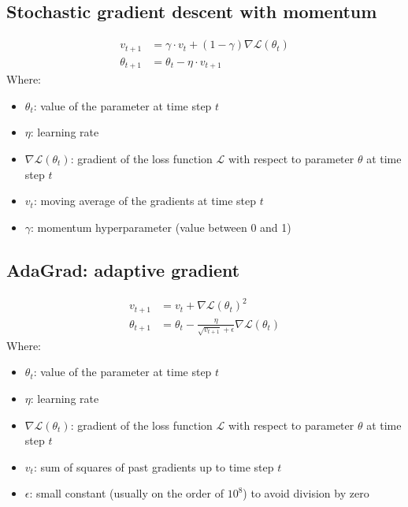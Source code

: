 \documentclass[a4paper]{report}
\newcommand{\ELL}{\mathcal{L}}
\begin{document}
\subsection{Stochastic gradient descent with momentum}
\begin{align*}
    v_{t+1}      &= \gamma \cdot v_t + (1-\gamma) \nabla\ELL(\theta_t) \\
    \theta_{t+1} &= \theta_t - \eta \cdot v_{t+1}
\end{align*}
Where:
\begin{itemize}
    \item $\theta_t$: value of the parameter at time step $t$
    \item $\eta$: learning rate
    \item $\nabla\ELL(\theta_t)$: gradient of the loss function $\ELL$ with respect to parameter $\theta$ at time step $t$
    \item $v_t$: moving average of the gradients at time step $t$
    \item $\gamma$: momentum hyperparameter (value between 0 and 1)
\end{itemize}

\subsection{AdaGrad: adaptive gradient}
\begin{align*}
    v_{t+1} &= v_t + \nabla\ELL(\theta_t)^2 \\
    \theta_{t+1} &= \theta_t - \frac{\eta}{\sqrt{v_{t+1}}+\epsilon} \nabla\ELL(\theta_t)
\end{align*}
Where:
\begin{itemize}
    \item $\theta_t$: value of the parameter at time step $t$
    \item $\eta$: learning rate
    \item $\nabla\ELL(\theta_t)$: gradient of the loss function $\ELL$ with respect to parameter $\theta$ at time step $t$
    \item $v_t$: sum of squares of past gradients up to time step $t$
    \item $\epsilon$: small constant (usually on the order of $10^8$) to avoid division by zero
\end{itemize}
\end{document}
